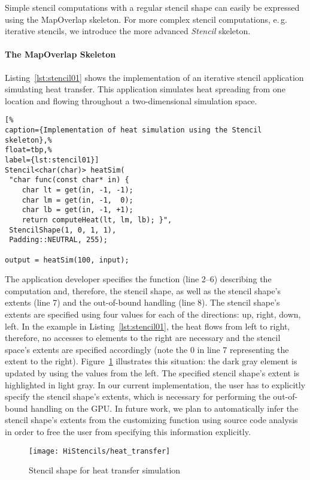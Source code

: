 Simple stencil computations with a regular stencil shape can easily be expressed using the MapOverlap skeleton.
For more complex stencil computations, e.\,g. iterative stencils, we introduce the more advanced \emph{Stencil} skeleton.
\paragraph{The MapOverlap Skeleton}

Listing~\ref{lst:stencil01} shows the implementation of an iterative stencil application simulating heat transfer.
This application simulates heat spreading from one location and flowing throughout a two-dimensional simulation space.
\begin{lstlisting}[%
caption={Implementation of heat simulation using the Stencil skeleton},%
float=tbp,%
label={lst:stencil01}]
Stencil<char(char)> heatSim(
 "char func(const char* in) {
    char lt = get(in, -1, -1);
    char lm = get(in, -1,  0);
    char lb = get(in, -1, +1);
    return computeHeat(lt, lm, lb); }",
 StencilShape(1, 0, 1, 1),
 Padding::NEUTRAL, 255);

output = heatSim(100, input);
\end{lstlisting}


The application developer specifies the function (line 2--6) describing the computation and, therefore, the stencil shape, as well as the stencil shape's extents (line 7) and the out-of-bound handling (line 8).
The stencil shape's extents are specified using four values for each of the directions:
up, right, down, left.
In the example in Listing~\ref{lst:stencil01}, the heat flows from left to right, therefore, no accesses to elements to the right are necessary and the stencil space's extents are specified accordingly (note the $0$ in line 7 representing the extent to the right).
Figure~\ref{fig:stencilShape} illustrates this situation: the dark gray element is updated by using the values from the left.
The specified stencil shape's extent is highlighted in light gray.
In our current implementation, the user has to explicitly specify the stencil shape's extents, which is necessary for performing the out-of-bound handling on the GPU.
In future work, we plan to automatically infer the stencil shape's extents
from the customizing function using source code analysis in order to free the user from specifying this information explicitly.
\begin{figure}
  \begin{centering}
    \texttt{[image: HiStencils/heat\_transfer]}
    \caption{Stencil shape for heat transfer simulation}
    \label{fig:stencilShape}
    \vspace{-.5em}
  \end{centering}
\end{figure}

